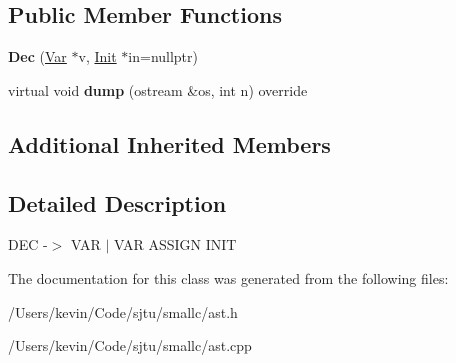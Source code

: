 \subsection*{Public Member Functions}
\begin{DoxyCompactItemize}
\item 
\mbox{\label{class_dec_a272e415617fe422cd8301bd5fcefd2ef}} 
{\bfseries Dec} (\hyperlink{class_var}{Var} $\ast$v, \hyperlink{class_init}{Init} $\ast$in=nullptr)
\item 
\mbox{\label{class_dec_aa776c5bb5bc8596a798ef491105996f0}} 
virtual void {\bfseries dump} (ostream \&os, int n) override
\end{DoxyCompactItemize}
\subsection*{Additional Inherited Members}


\subsection{Detailed Description}
D\+EC -\/$>$ V\+AR $\vert$ V\+AR A\+S\+S\+I\+GN I\+N\+IT 

The documentation for this class was generated from the following files\+:\begin{DoxyCompactItemize}
\item 
/\+Users/kevin/\+Code/sjtu/smallc/ast.\+h\item 
/\+Users/kevin/\+Code/sjtu/smallc/ast.\+cpp\end{DoxyCompactItemize}
